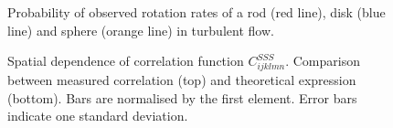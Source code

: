 \documentclass[thesis.tex]{subfiles}
\begin{document}
\begin{figure}
	\begin{center}
\end{center}
\caption{ Probability of observed rotation rates of a rod (red line), disk (blue line) and sphere (orange line) in turbulent flow. }%
\end{figure}

\begin{figure}
	\begin{center}
\end{center}
\caption{ Spatial dependence of correlation function $C^{SSS}_{ijklmn}$. Comparison between measured correlation (top) and theoretical expression  (bottom). Bars are normalised by the first element. Error bars indicate one standard deviation.}%
\end{figure}
\end{document}
